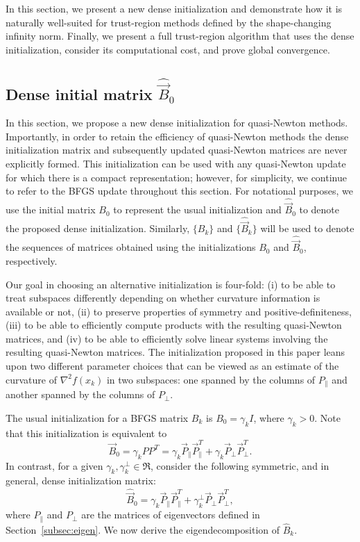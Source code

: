 In this section, we present a new dense initialization and demonstrate
how it is naturally well-suited for trust-region methods defined by
the shape-changing infinity norm. Finally, we present a full
trust-region algorithm that uses the dense initialization, consider
its computational cost, and prove global convergence.


\subsection{Dense initial matrix $ \widehat{\vec{B}}_0 $}
\label{subsec:denseinitial}
In this section, we propose a new dense initialization for
quasi-Newton methods.  Importantly, in order to retain the efficiency
of quasi-Newton methods the dense initialization matrix and
subsequently updated quasi-Newton matrices are never explicitly
formed.  This initialization can be used with any quasi-Newton update
for which there is a compact representation; however, for simplicity,
we continue to refer to the {\small BFGS} update throughout this
section.  For notational purposes, we use the initial matrix $B_0$ to
represent the usual initialization
and $\widehat{\vec{B}}_0$ to denote the proposed dense initialization.
Similarly, $\{B_k\}$ and $\{\widehat{\vec{B}}_k\}$ will be used to
denote the sequences of matrices obtained using the
initializations $B_0$ and $\widehat{\vec{B}}_0$, respectively.

Our goal in choosing an alternative initialization is
four-fold:
(i) to be able to treat subspaces differently depending on whether
curvature information is available or not,
(ii) to preserve properties of symmetry and positive-definiteness,
(iii) to be able to efficiently compute products with the resulting quasi-Newton matrices,
and
(iv) to be able to efficiently solve linear systems 
involving the resulting quasi-Newton matrices.  The initialization proposed
in this paper leans upon two different parameter choices that can be viewed
as an 
estimate of the curvature of $\nabla^2 f(x_k)$ in two subspaces:
one spanned by the columns
of $P_\parallel$ and another 
 spanned by the columns of $P_\perp$.  


The usual initialization for a {\small BFGS} matrix $B_k$ is $B_0=\gamma_k I$,
where $\gamma_k>0$.
Note that this initialization is equivalent to
$$	\vec{B}_0 = \gamma_kPP^T=\gamma_k\vec{P}_{\parallel} \vec{P}^T_{\parallel} + \gamma_{k} \vec{P}_{\perp} \vec{P}^T_{\perp}.$$
In contrast, for a given $\gamma_k, \gamma^\perp_k \in \Re$, consider the
following symmetric, and in general, dense initialization matrix:
\begin{equation}\label{eq:denseB0}
	\widehat{\vec{B}}_0 = \gamma_k\vec{P}_{\parallel} \vec{P}^T_{\parallel} + \gamma^\perp_k \vec{P}_{\perp} \vec{P}^T_{\perp},
\end{equation} 
where $P_\parallel$ and $P_\perp$ are the matrices of eigenvectors 
defined in Section~\ref{subsec:eigen}.  We now derive the
eigendecomposition of $\widehat{B}_k$.


